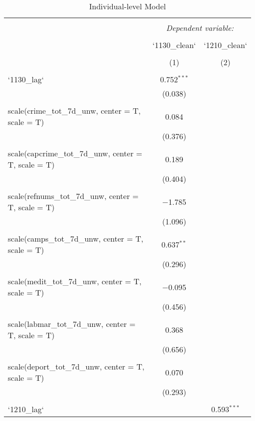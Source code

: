 
\begin{table}[!htbp] \centering 
  \caption{Individual-level Model} 
  \label{} 
\begin{tabular}{@{\extracolsep{5pt}}lcc} 
\\[-1.8ex]\hline 
\hline \\[-1.8ex] 
 & \multicolumn{2}{c}{\textit{Dependent variable:}} \\ 
\cline{2-3} 
\\[-1.8ex] & `1130\_clean` & `1210\_clean` \\ 
\\[-1.8ex] & (1) & (2)\\ 
\hline \\[-1.8ex] 
 `1130\_lag` & 0.752$^{***}$ &  \\ 
  & (0.038) &  \\ 
  & & \\ 
 scale(crime\_tot\_7d\_unw, center = T, scale = T) & 0.084 &  \\ 
  & (0.376) &  \\ 
  & & \\ 
 scale(capcrime\_tot\_7d\_unw, center = T, scale = T) & 0.189 &  \\ 
  & (0.404) &  \\ 
  & & \\ 
 scale(refnums\_tot\_7d\_unw, center = T, scale = T) & $-$1.785 &  \\ 
  & (1.096) &  \\ 
  & & \\ 
 scale(camps\_tot\_7d\_unw, center = T, scale = T) & 0.637$^{**}$ &  \\ 
  & (0.296) &  \\ 
  & & \\ 
 scale(medit\_tot\_7d\_unw, center = T, scale = T) & $-$0.095 &  \\ 
  & (0.456) &  \\ 
  & & \\ 
 scale(labmar\_tot\_7d\_unw, center = T, scale = T) & 0.368 &  \\ 
  & (0.656) &  \\ 
  & & \\ 
 scale(deport\_tot\_7d\_unw, center = T, scale = T) & 0.070 &  \\ 
  & (0.293) &  \\ 
  & & \\ 
 `1210\_lag` &  & 0.593$^{***}$ \\ 

\end{tabular}
\end{table}
